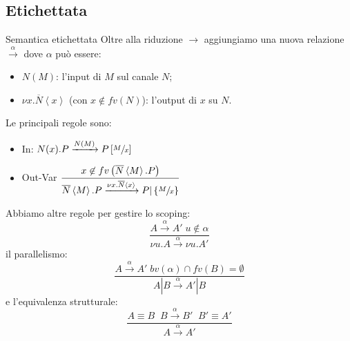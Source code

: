 \documentclass{beamer}
\theoremstyle{plain}
\theoremstyle{definition}
\theoremstyle{remark}
\newcommand{\obar}[1]{\overline{#1}}
\newcommand{\set}[1]{\left\{#1\right\}}
\newcommand{\pa}[1]{\left(#1\right)}
\newcommand{\ang}[1]{\left<#1\right>}
\newcommand{\bra}[1]{\left[#1\right]}
\begin{document}
\subsection{Etichettata}

\begin{frame}{Semantica etichettata}
  Oltre alla riduzione $\rightarrow$ aggiungiamo una nuova relazione
  $\xrightarrow{\alpha}$ dove $\alpha$ pu\`o essere:
  \begin{itemize}
  \item $N(M)$: l'input di $M$ sul canale $N$;
  \item $\nu x.\obar{N}\ang{x}$ (con $x\not\in fv(N)$): l'output di
    $x$ su $N$.
  \end{itemize}
  
  Le principali regole sono:
  \begin{itemize}
  \item In: \( N(x).P \xrightarrow{N(M)} P\bra{\sfrac{M}{x}} \)
  \item Out-Var \( \displaystyle \frac{x\not\in
      fv\pa{\obar{N}\ang{M}.P}}{\obar{N}\ang{M}.P \xrightarrow{\nu
        x.\obar{N}\ang{x}} P|\set{\sfrac{M}{x}}} \)
  \end{itemize}

\end{frame}

\begin{frame}
  Abbiamo altre regole per gestire lo scoping:
  \[ \frac{A \xrightarrow{\alpha} A'\; u\not\in\alpha}{\nu u.A
      \xrightarrow{\alpha} \nu u.A'} \]
  il parallelismo:
  \[ \frac{A \xrightarrow{\alpha} A'\;bv(\alpha) \cap fv(B) =
      \emptyset}{A|B \xrightarrow{\alpha} A'|B} \]
  e l'equivalenza strutturale:
  \[ \frac{A \equiv B\;\; B\xrightarrow{\alpha} B'\;\; B' \equiv A'}{A
      \xrightarrow{\alpha} A'} \]
\end{frame}
\end{document}
